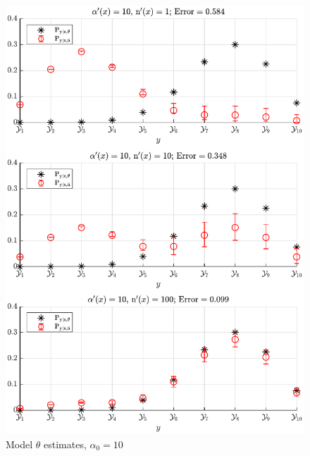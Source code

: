 \documentclass[12pt]{article}
\begin{document}
\begin{figure}
\centering
\includegraphics[scale=0.8]{P_yx_error_a0_10.pdf}
\caption{Model $\theta$ estimates, $\alpha_0 = 10$}
\label{fig:P_yx_error_a0_10}
\end{figure}
\end{document}
